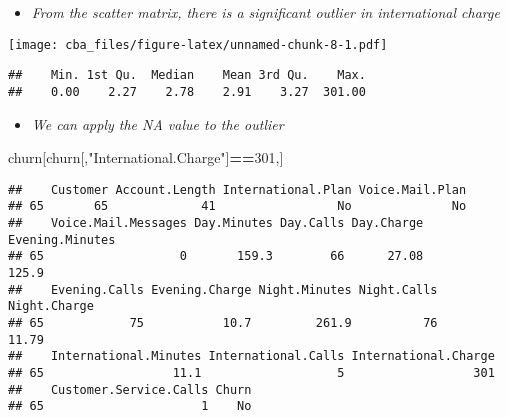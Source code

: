 \documentclass[]{article}
\newenvironment{Shaded}{\begin{snugshade}}{\end{snugshade}}
\newcommand{\DecValTok}[1]{\textcolor[rgb]{0.00,0.00,0.81}{#1}}
\newcommand{\KeywordTok}[1]{\textcolor[rgb]{0.13,0.29,0.53}{\textbf{#1}}}
\newcommand{\NormalTok}[1]{#1}
\newcommand{\OperatorTok}[1]{\textcolor[rgb]{0.81,0.36,0.00}{\textbf{#1}}}
\newcommand{\StringTok}[1]{\textcolor[rgb]{0.31,0.60,0.02}{#1}}
\providecommand{\tightlist}{%
  \setlength{\itemsep}{0pt}\setlength{\parskip}{0pt}}
\begin{document}
\begin{itemize}
\tightlist
\item
  \emph{From the scatter matrix, there is a significant outlier in
  international charge}
\end{itemize}

\begin{Shaded}
\end{Shaded}

\texttt{[image: cba\_files/figure-latex/unnamed-chunk-8-1.pdf]}

\begin{Shaded}
\end{Shaded}

\begin{verbatim}
##    Min. 1st Qu.  Median    Mean 3rd Qu.    Max. 
##    0.00    2.27    2.78    2.91    3.27  301.00
\end{verbatim}

\begin{itemize}
\tightlist
\item
  \emph{We can apply the NA value to the outlier}
\end{itemize}

\begin{Shaded}
\begin{Highlighting}[]
\NormalTok{churn[churn[,}\StringTok{"International.Charge"}\NormalTok{]}\OperatorTok{==}\DecValTok{301}\NormalTok{,]}
\end{Highlighting}
\end{Shaded}

\begin{verbatim}
##    Customer Account.Length International.Plan Voice.Mail.Plan
## 65       65             41                 No              No
##    Voice.Mail.Messages Day.Minutes Day.Calls Day.Charge Evening.Minutes
## 65                   0       159.3        66      27.08           125.9
##    Evening.Calls Evening.Charge Night.Minutes Night.Calls Night.Charge
## 65            75           10.7         261.9          76        11.79
##    International.Minutes International.Calls International.Charge
## 65                  11.1                   5                  301
##    Customer.Service.Calls Churn
## 65                      1    No
\end{verbatim}
\end{document}
